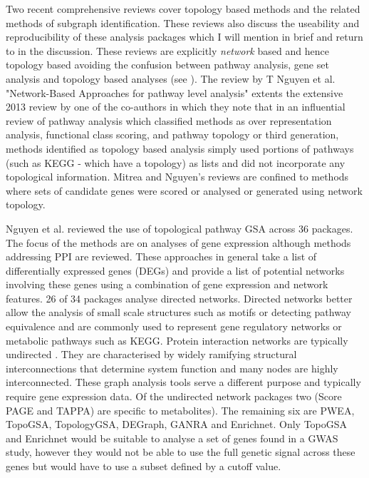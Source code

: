 Two recent comprehensive reviews cover topology based methods\cite{nguyen2018network} and the related methods of subgraph identification\cite{nguyen2019comprehensive}. These reviews also discuss the useability and reproducibility of these analysis packages which I will mention in brief and return to in the discussion. These reviews are explicitly \textit{network} based and hence topology based avoiding the confusion between pathway analysis, gene set analysis and topology based analyses (see \cite{mitrea2013methods}). The review by T Nguyen et al. "Network-Based Approaches for pathway level analysis" \cite{nguyen2018network} extents the extensive 2013 review by one of the co-authors \cite{mitrea2013methods} in which they note \cite{mitrea2013methods} that in an influential review of pathway analysis \cite{khatri2012ten} which classified methods as  over representation analysis, functional class scoring, and pathway topology or third generation, methods  identified as topology based analysis simply used portions of pathways (such as KEGG\cite{kanehisa2000kegg} - which have a topology) as lists and did not incorporate any topological information.  Mitrea\cite{mitrea2013methods} and Nguyen's reviews \cite{nguyen2018network} are confined to methods where sets of candidate genes were scored or analysed or generated using network topology.


  Nguyen et al.\cite{nguyen2018network} reviewed the use of topological pathway GSA across 36 packages.
The focus of the methods are on analyses of gene expression although methods addressing PPI are reviewed. These approaches in general take a list of differentially expressed genes (DEGs) and provide a list of potential networks involving these genes using a combination of gene expression and network features. 
26 of 34 packages analyse directed networks. Directed networks better allow the analysis of small scale structures such as motifs  or detecting pathway equivalence and are commonly used to represent gene regulatory networks or metabolic pathways such as KEGG\cite{kanehisa2000kegg}.  Protein interaction networks are typically undirected \cite{newman2018networks}. They are characterised by widely ramifying structural interconnections that determine system function and many nodes are highly interconnected. These graph analysis tools serve a different purpose and typically require gene expression data. Of the undirected network packages two (Score PAGE and TAPPA) are specific to metabolites). The remaining six are PWEA, TopoGSA, TopologyGSA, DEGraph, GANRA and Enrichnet. Only TopoGSA and Enrichnet would be suitable to analyse a set of genes found in a GWAS study, however they would not be able to use the full genetic signal across these genes but would have to use a subset defined by a cutoff value.



